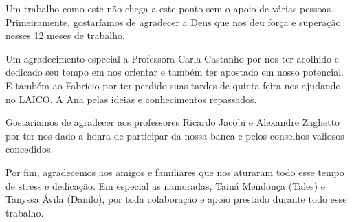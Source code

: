 \begin{agradecimentos}
	
	Um trabalho como este não chega a este ponto sem o apoio de várias pessoas. Primeiramente, gostaríamos de agradecer a Deus que nos deu força e superação nesses 12 meses de trabalho.

	Um agradecimento especial a Professora Carla Castanho por nos ter acolhido e dedicado seu tempo em nos orientar e também ter apostado em nosso potencial. E também ao Fabrício por ter perdido suas tardes de quinta-feira nos ajudando no LAICO. A Ana pelas ideias e conhecimentos repassados.

	Gostaríamos de agradecer aos professores Ricardo Jacobi e Alexandre Zaghetto por ter-nos dado a honra de participar da nossa banca e pelos conselhos valiosos concedidos.

	Por fim, agradecemos aos amigos e familiares que nos aturaram todo esse tempo de stress e dedicação. Em especial as namoradas, Tainá Mendonça (Tales) e Tanyssa Ávila (Danilo), por toda colaboração e apoio prestado durante todo esse trabalho.

\end{agradecimentos}